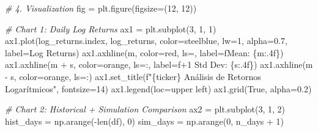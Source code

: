 \documentclass[
  11pt,
]{article}
\newenvironment{Shaded}{}{}
\newcommand{\BuiltInTok}[1]{\textcolor[rgb]{0.00,0.50,0.00}{#1}}
\newcommand{\CommentTok}[1]{\textcolor[rgb]{0.38,0.63,0.69}{\textit{#1}}}
\newcommand{\DecValTok}[1]{\textcolor[rgb]{0.25,0.63,0.44}{#1}}
\newcommand{\FloatTok}[1]{\textcolor[rgb]{0.25,0.63,0.44}{#1}}
\newcommand{\NormalTok}[1]{#1}
\newcommand{\OperatorTok}[1]{\textcolor[rgb]{0.40,0.40,0.40}{#1}}
\newcommand{\SpecialCharTok}[1]{\textcolor[rgb]{0.25,0.44,0.63}{#1}}
\newcommand{\SpecialStringTok}[1]{\textcolor[rgb]{0.73,0.40,0.53}{#1}}
\newcommand{\StringTok}[1]{\textcolor[rgb]{0.25,0.44,0.63}{#1}}
\newcommand{\VariableTok}[1]{\textcolor[rgb]{0.10,0.09,0.49}{#1}}
\begin{document}
\begin{Shaded}
\begin{Highlighting}[]
\CommentTok{\# 4. Visualization}
\NormalTok{fig }\OperatorTok{=}\NormalTok{ plt.figure(figsize}\OperatorTok{=}\NormalTok{(}\DecValTok{12}\NormalTok{, }\DecValTok{12}\NormalTok{))}

\CommentTok{\# Chart 1: Daily Log Returns}
\NormalTok{ax1 }\OperatorTok{=}\NormalTok{ plt.subplot(}\DecValTok{3}\NormalTok{, }\DecValTok{1}\NormalTok{, }\DecValTok{1}\NormalTok{)}
\NormalTok{ax1.plot(log\_returns.index, log\_returns, color}\OperatorTok{=}\StringTok{\textquotesingle{}steelblue\textquotesingle{}}\NormalTok{, lw}\OperatorTok{=}\DecValTok{1}\NormalTok{, alpha}\OperatorTok{=}\FloatTok{0.7}\NormalTok{, label}\OperatorTok{=}\StringTok{\textquotesingle{}Log Returns\textquotesingle{}}\NormalTok{)}
\NormalTok{ax1.axhline(m, color}\OperatorTok{=}\StringTok{\textquotesingle{}red\textquotesingle{}}\NormalTok{, ls}\OperatorTok{=}\StringTok{\textquotesingle{}{-}{-}\textquotesingle{}}\NormalTok{, label}\OperatorTok{=}\SpecialStringTok{f\textquotesingle{}Mean: }\SpecialCharTok{\{}\NormalTok{m}\SpecialCharTok{:.4f\}}\SpecialStringTok{\textquotesingle{}}\NormalTok{)}
\NormalTok{ax1.axhline(m }\OperatorTok{+}\NormalTok{ s, color}\OperatorTok{=}\StringTok{\textquotesingle{}orange\textquotesingle{}}\NormalTok{, ls}\OperatorTok{=}\StringTok{\textquotesingle{}:\textquotesingle{}}\NormalTok{, label}\OperatorTok{=}\SpecialStringTok{f\textquotesingle{}+1 Std Dev: }\SpecialCharTok{\{}\NormalTok{s}\SpecialCharTok{:.4f\}}\SpecialStringTok{\textquotesingle{}}\NormalTok{)}
\NormalTok{ax1.axhline(m }\OperatorTok{{-}}\NormalTok{ s, color}\OperatorTok{=}\StringTok{\textquotesingle{}orange\textquotesingle{}}\NormalTok{, ls}\OperatorTok{=}\StringTok{\textquotesingle{}:\textquotesingle{}}\NormalTok{)}
\NormalTok{ax1.set\_title(}\SpecialStringTok{f"}\SpecialCharTok{\{}\NormalTok{ticker}\SpecialCharTok{\}}\SpecialStringTok{ Análisis de Retornos Logarítmicos"}\NormalTok{, fontsize}\OperatorTok{=}\DecValTok{14}\NormalTok{)}
\NormalTok{ax1.legend(loc}\OperatorTok{=}\StringTok{\textquotesingle{}upper left\textquotesingle{}}\NormalTok{)}
\NormalTok{ax1.grid(}\VariableTok{True}\NormalTok{, alpha}\OperatorTok{=}\FloatTok{0.2}\NormalTok{)}

\CommentTok{\# Chart 2: Historical + Simulation Comparison}
\NormalTok{ax2 }\OperatorTok{=}\NormalTok{ plt.subplot(}\DecValTok{3}\NormalTok{, }\DecValTok{1}\NormalTok{, }\DecValTok{2}\NormalTok{)}
\NormalTok{hist\_days }\OperatorTok{=}\NormalTok{ np.arange(}\OperatorTok{{-}}\BuiltInTok{len}\NormalTok{(df), }\DecValTok{0}\NormalTok{)}
\NormalTok{sim\_days }\OperatorTok{=}\NormalTok{ np.arange(}\DecValTok{0}\NormalTok{, n\_days }\OperatorTok{+} \DecValTok{1}\NormalTok{)}


\end{Highlighting}
\end{Shaded}
\end{document}
